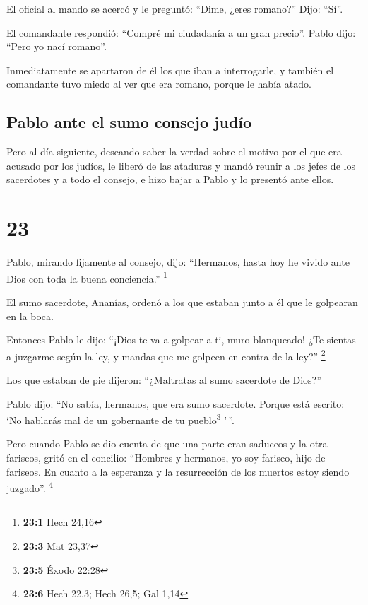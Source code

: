  El oficial al mando se acercó y le preguntó: ``Dime,
¿eres romano?'' Dijo: ``Sí''.

 El comandante respondió: ``Compré mi ciudadanía a un
gran precio''. Pablo dijo: ``Pero yo nací romano''.

 Inmediatamente se apartaron de él los que iban a
interrogarle, y también el comandante tuvo miedo al ver que era romano,
porque le había atado.

\hypertarget{pablo-ante-el-sumo-consejo-juduxedo}{%
\subsection{Pablo ante el sumo consejo
judío}\label{pablo-ante-el-sumo-consejo-juduxedo}}

 Pero al día siguiente, deseando saber la verdad sobre el
motivo por el que era acusado por los judíos, le liberó de las ataduras
y mandó reunir a los jefes de los sacerdotes y a todo el consejo, e hizo
bajar a Pablo y lo presentó ante ellos.

\hypertarget{section-22}{%
\section{23}\label{section-22}}

 Pablo, mirando fijamente al consejo, dijo: ``Hermanos,
hasta hoy he vivido ante Dios con toda la buena conciencia.''
\footnote{\textbf{23:1} Hech 24,16}

 El sumo sacerdote, Ananías, ordenó a los que estaban
junto a él que le golpearan en la boca.

 Entonces Pablo le dijo: ``¡Dios te va a golpear a ti,
muro blanqueado! ¿Te sientas a juzgarme según la ley, y mandas que me
golpeen en contra de la ley?'' \footnote{\textbf{23:3} Mat 23,37}

 Los que estaban de pie dijeron: ``¿Maltratas al sumo
sacerdote de Dios?''

 Pablo dijo: ``No sabía, hermanos, que era sumo sacerdote.
Porque está escrito: `No hablarás mal de un gobernante de tu
pueblo\footnote{\textbf{23:5} Éxodo 22:28} '\,''.

 Pero cuando Pablo se dio cuenta de que una parte eran
saduceos y la otra fariseos, gritó en el concilio: ``Hombres y hermanos,
yo soy fariseo, hijo de fariseos. En cuanto a la esperanza y la
resurrección de los muertos estoy siendo juzgado''. \footnote{\textbf{23:6}
  Hech 22,3; Hech 26,5; Gal 1,14}

